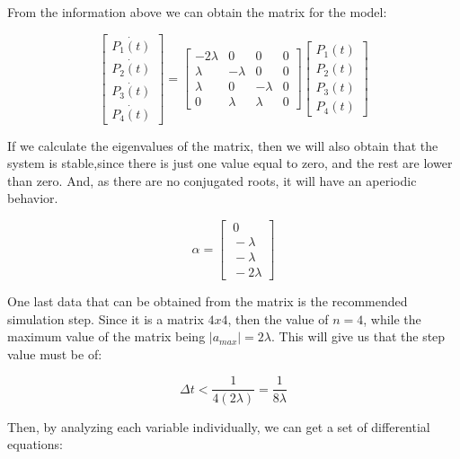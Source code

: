\documentclass{article}
\begin{document}
\begin{doublespacing}
\par From the information above we can obtain the matrix for the model:

\begin{equation}
\begin{bmatrix}
\dot{P_1 (t)}\\
\dot{P_2 (t)}\\
\dot{P_3 (t)}\\
\dot{P_4 (t)}
\end{bmatrix}
= 
\begin{bmatrix}
-2\lambda & 0 & 0 & 0\\
 \lambda & -\lambda & 0 & 0\\
 \lambda & 0 & -\lambda & 0\\
 0 & \lambda & \lambda & 0
\end{bmatrix}
\begin{bmatrix}
P_1 (t)\\
P_2 (t)\\
P_3 (t)\\
P_4 (t)
\end{bmatrix}
\end{equation}

\par If we calculate the eigenvalues of the matrix, then we will also obtain that the system is stable,since there is just one value equal to zero, and the rest are lower than zero. And, as there are no conjugated roots, it will have an aperiodic behavior. 

\begin{equation}
\alpha = 
\begin{bmatrix}
\ 0 \\
\ - \lambda \\
\ - \lambda \\
\ -2 \lambda
\end{bmatrix}
\end{equation}

\par One last data that can be obtained from the matrix is the recommended simulation step. Since it is a matrix $4x4$, then the value of $n = 4$, while the maximum value of the matrix being $|a_{max}| = 2 \lambda$. This will give us that the step value must be of:

\begin{equation}
\Delta t< \frac{1}{4 (2 \lambda)} = \frac{1}{8 \lambda}
\end{equation}


\par Then, by analyzing each variable individually, we can get a set of differential equations:


\end{doublespacing}
\end{document}
